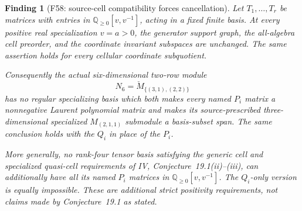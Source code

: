 \documentclass[11pt,a4paper]{article}
\newcommand{\Q}{\mathbb Q}\newcommand{\Z}{\mathbb Z}\newcommand{\C}{\mathbb C}\newcommand{\N}{\mathbb N}\newcommand{\F}{\mathbb F}
\newcommand{\fid}[1]{\textsf{#1}}\newcommand{\gate}[1]{\textsf{#1}}
\theoremstyle{named}\newtheorem{finding}{Finding}[section]
\theoremstyle{definition}\newtheorem{definition}[finding]{Definition}
\theoremstyle{remark}\newtheorem{remark}[finding]{Remark}
\begin{document}
\begin{finding}[\fid{F58}: source-cell compatibility forces cancellation]
\label{f:cellpositivityspecialization}
Let \(T_1,\ldots,T_r\) be matrices with entries in
\(\Q_{\ge0}[v,v^{-1}]\), acting in a fixed finite basis.
At every positive real specialization \(v=a>0\), the generator
support graph, the all-algebra cell preorder, and the coordinate
invariant subspaces are unchanged. The same assertion holds for
every cellular coordinate subquotient.

Consequently the actual six-dimensional two-row module
\[
N_6=\check M_{\{(3,1),(2,2)\}}
\]
has no regular specializing basis which both makes every named
\(P_i\) matrix a nonnegative Laurent polynomial matrix and makes
its source-prescribed three-dimensional specialized
\(M_{(2,1,1)}\) submodule a basis-subset span.
The same conclusion holds with the \(Q_i\) in place of the \(P_i\).

More generally, no rank-four tensor basis satisfying the generic
cell and specialized quasi-cell requirements of IV,
Conjecture~19.1(ii)--(iii), can additionally have all its named
\(P_i\) matrices in \(\Q_{\ge0}[v,v^{-1}]\).
The \(Q_i\)-only version is equally impossible.
These are additional strict positivity requirements, not claims
made by Conjecture~19.1 as stated.
\end{finding}
\end{document}
